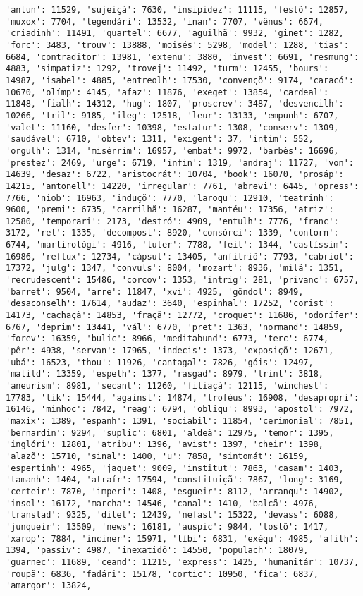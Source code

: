 \documentclass[11pt]{article}
\begin{document}
\begin{Verbatim}[commandchars=\\\{\}]
'antun': 11529, 'sujeiçã': 7630, 'insipidez': 11115, 'festõ': 12857, 'muxox': 7704, 'legendári': 13532, 'inan': 7707, 'vênus': 6674, 'criadinh': 11491, 'quartel': 6677, 'aguilhã': 9932, 'ginet': 1282, 'forc': 3483, 'trouv': 13888, 'moisés': 5298, 'model': 1288, 'tias': 6684, 'contraditor': 13981, 'extenu': 3880, 'invest': 6691, 'resmung': 4883, 'simpatiz': 1292, 'trovej': 11492, 'turm': 12455, 'bours': 14987, 'isabel': 4885, 'entreolh': 17530, 'convençõ': 9174, 'caracó': 10670, 'olímp': 4145, 'afaz': 11876, 'exeget': 13854, 'cardeal': 11848, 'fialh': 14312, 'hug': 1807, 'proscrev': 3487, 'desvencilh': 10266, 'tril': 9185, 'ileg': 12518, 'leur': 13133, 'empunh': 6707, 'valet': 11160, 'desfer': 10398, 'estatur': 1308, 'conserv': 1309, 'saudável': 6710, 'obtev': 1311, 'exigent': 37, 'intim': 552, 'orgulh': 1314, 'misérrim': 16957, 'embat': 9972, 'barbès': 16696, 'prestez': 2469, 'urge': 6719, 'infin': 1319, 'andraj': 11727, 'von': 14639, 'desaz': 6722, 'aristocrát': 10704, 'book': 16070, 'prosáp': 14215, 'antonell': 14220, 'irregular': 7761, 'abrevi': 6445, 'opress': 7766, 'niob': 16963, 'induçõ': 7770, 'laroqu': 12910, 'teatrinh': 9600, 'premi': 6735, 'carrilhã': 16287, 'mantéu': 17356, 'atriz': 12580, 'temporari': 2173, 'destró': 4909, 'entulh': 7776, 'franc': 3172, 'rel': 1335, 'decompost': 8920, 'consórci': 1339, 'contorn': 6744, 'martirológi': 4916, 'luter': 7788, 'feit': 1344, 'castíssim': 16986, 'reflux': 12734, 'cápsul': 13405, 'anfitriõ': 7793, 'cabriol': 17372, 'julg': 1347, 'convuls': 8004, 'mozart': 8936, 'milã': 1351, 'recrudescent': 15486, 'corcov': 1353, 'intrig': 281, 'privanc': 6757, 'barret': 9504, 'arre': 11847, 'xvi': 4925, 'gôndol': 8949, 'desaconselh': 17614, 'audaz': 3640, 'espinhal': 17252, 'corist': 14173, 'cachaçã': 14853, 'fraçã': 12772, 'croquet': 11686, 'odorífer': 6767, 'deprim': 13441, 'vál': 6770, 'pret': 1363, 'normand': 14859, 'forev': 16359, 'bulic': 8966, 'meditabund': 6773, 'terc': 6774, 'pêr': 4938, 'servan': 17965, 'indecis': 1373, 'exposiçõ': 12671, 'ubá': 16523, 'thou': 11926, 'cantagal': 7826, 'góis': 12497, 'matild': 13359, 'espelh': 1377, 'rasgad': 8979, 'trint': 3818, 'aneurism': 8981, 'secant': 11260, 'filiaçã': 12115, 'winchest': 17783, 'tik': 15444, 'against': 14874, 'troféus': 16908, 'desapropri': 16146, 'minhoc': 7842, 'reag': 6794, 'obliqu': 8993, 'apostol': 7972, 'maxix': 1389, 'espanh': 1391, 'sociabil': 11854, 'cerimonial': 7851, 'bernardin': 9294, 'suplic': 6801, 'aldeã': 12975, 'temor': 1395, 'inglóri': 12801, 'atribu': 1396, 'avist': 1397, 'cheir': 1398, 'alazõ': 15710, 'sinal': 1400, 'u': 7858, 'sintomát': 16159, 'espertinh': 4965, 'jaquet': 9009, 'institut': 7863, 'casam': 1403, 'tamanh': 1404, 'atraír': 17594, 'constituiçã': 7867, 'long': 3169, 'certeir': 7870, 'imperi': 1408, 'esgueir': 8112, 'arranqu': 14902, 'insol': 16172, 'marcha': 14546, 'canal': 1410, 'balcã': 4976, 'translad': 9325, 'dilet': 12439, 'nefast': 15322, 'devass': 6088, 'junqueir': 13509, 'news': 16181, 'auspic': 9844, 'tostõ': 1417, 'xarop': 7884, 'inciner': 15971, 'tíbi': 6831, 'exéqu': 4985, 'afilh': 1394, 'passiv': 4987, 'inexatidõ': 14550, 'populach': 18079, 'guarnec': 11689, 'ceand': 11215, 'express': 1425, 'humanitár': 10737, 'roupã': 6836, 'fadári': 15178, 'cortic': 10950, 'fica': 6837, 'amargor': 13824, 
\end{Verbatim}
\end{document}
